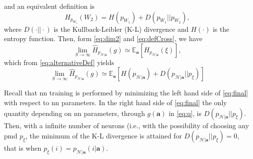 \documentclass[conference,final]{IEEEtran}
\newcommand{\cross}[2]{H_{#1}(#2)}
\newcommand{\hatcross}[2]{\hat{H}_{#1}(#2)}
\newcommand{\gy}{g(\bm a)}
\newcommand{\E}[2]{\mathbb{E}_{#1}\left[#2\right]}
\begin{document}
\begin{appendices}
\begin{equation}
\end{equation}
and an equivalent definition is
\begin{equation}
\label{eq:alternativeDef}
		\cross{p_{W_1}}{W_2} = H (p_{W_1}) + D(p_{W_1}||p_{W_2}),
\end{equation}
where $D(\cdot||\cdot)$ is the Kullback-Leibler (K-L) divergence and $H(\cdot)$ is the entropy function.
Then, form \eqref{eq:dim2} and \eqref{eq:defCross}, we have 
\begin{equation}
		\lim_{S \to \infty}	\hatcross{p_{\mathcal{H}|\bm a}}{g} \simeq \mathbb{E}_{\bm a} \left[ \cross{p_{\mathcal{H}|\bm a}}{\xi} \right],
\end{equation}
which from \eqref{eq:alternativeDef} yields
\begin{equation}
\label{eq:final}
		\lim_{S \to \infty}	\hatcross{p_{\mathcal{H}|\bm a}}{g} \simeq 
		\E{\bm a}{H ( p_{\mathcal{H}|\bm a}) + D( p_{\mathcal{H}|\bm a}|| p_\xi)}
\end{equation}

Recall that \ac{nn} training is performed by minimizing the left hand side of \eqref{eq:final} with respect to \ac{nn} parameters. In the right hand side of \eqref{eq:final} the only quantity depending on \ac{nn} parameters, through $\gy$ in \eqref{eq:q}, is $D( p_{\mathcal{H}|\bm a}||p_\xi)$. Then, with a infinite number of neurons (i.e., with the possibility of choosing any \ac{pmd} $p_\xi$, the minimum of the K-L divergence is  attained for $D(p_{\mathcal{H}|\bm a}||p_\xi)=0$, that is when $p_\xi(i) = p_{\mathcal{H}|\bm a}(i|\bm{a})$.
\end{appendices}

\renewcommand*{\bibfont}{\footnotesize}

\printbibliography
\end{document}
